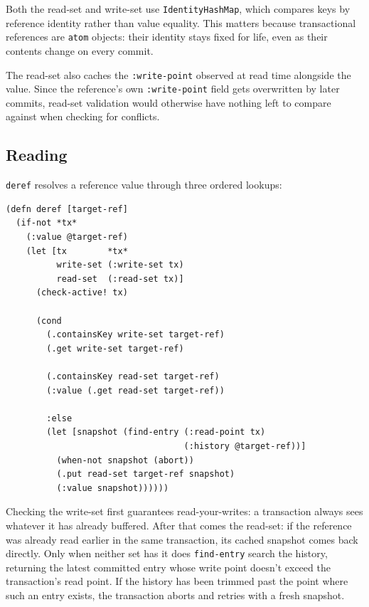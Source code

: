 Both the read-set and write-set use \texttt{IdentityHashMap}, which compares
keys by reference identity rather than value equality. This matters because
transactional references are \texttt{atom} objects: their identity stays
fixed for life, even as their contents change on every commit.

The read-set also caches the \texttt{:write-point} observed at read time
alongside the value. Since the reference's own \texttt{:write-point} field
gets overwritten by later commits, read-set validation would otherwise have
nothing left to compare against when checking for conflicts.

\subsection{Reading}
\label{sec:reading}

\texttt{deref} resolves a reference value through three ordered lookups:

\begin{listing}[H]
  \begin{verbatim}
(defn deref [target-ref]
  (if-not *tx*
    (:value @target-ref)
    (let [tx        *tx*
          write-set (:write-set tx)
          read-set  (:read-set tx)]
      (check-active! tx)

      (cond
        (.containsKey write-set target-ref)
        (.get write-set target-ref)

        (.containsKey read-set target-ref)
        (:value (.get read-set target-ref))

        :else
        (let [snapshot (find-entry (:read-point tx)
                                   (:history @target-ref))]
          (when-not snapshot (abort))
          (.put read-set target-ref snapshot)
          (:value snapshot))))))
  \end{verbatim}
  \caption{Transactional read. The write-set is checked first for
    read-your-writes semantics; the read-set returns the previously cached
    snapshot; the version history is checked last.}
  \label{lst:deref}
\end{listing}

Checking the write-set first guarantees read-your-writes: a transaction
always sees whatever it has already buffered. After that comes the
read-set: if the reference was already read earlier in the same
transaction, its cached snapshot comes back directly. Only when neither set
has it does \texttt{find-entry} search the history, returning the latest
committed entry whose write point doesn't exceed the transaction's read
point. If the history has been trimmed past the point where such an entry
exists, the transaction aborts and retries with a fresh snapshot.

